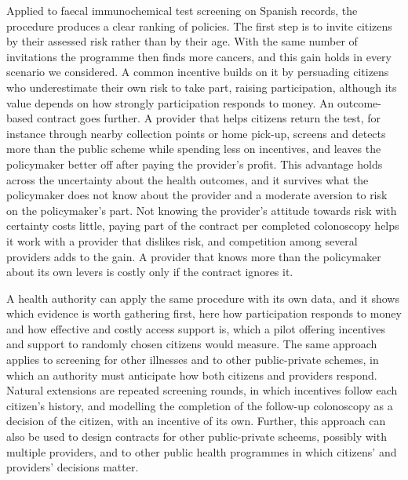 \documentclass[12pt]{article}
\begin{document}
Applied to faecal immunochemical test screening on Spanish records, the procedure produces a clear ranking of policies. The first step is to invite citizens by their assessed risk rather than by their age. With the same number of invitations the programme then finds more cancers, and this gain holds in every scenario we considered. A common incentive builds on it by persuading citizens who underestimate their own risk to take part, raising participation, although its value depends on how strongly participation responds to money. An outcome-based contract goes further. A provider that helps citizens return the test, for instance through nearby collection points or home pick-up, screens and detects more than the public scheme while spending less on incentives, and leaves the policymaker better off after paying the provider's profit. This advantage holds across the uncertainty about the health outcomes, and it survives what the policymaker does not know about the provider and a moderate aversion to risk on the policymaker's part. Not knowing the provider's attitude towards risk with certainty costs little, paying part of the contract per completed colonoscopy helps it work with a provider that dislikes risk, and competition among several providers adds to the gain. A provider that knows more than the policymaker about its own levers is costly only if the contract ignores it.

A health authority can apply the same procedure with its own data, and it shows which evidence is worth gathering first, here how participation responds to money and how effective and costly access support is, which a pilot offering incentives and support to randomly chosen citizens would measure. The same approach applies to screening for other illnesses and to other public-private schemes, in which an authority must anticipate how both citizens and providers respond. Natural extensions are repeated screening rounds, in which incentives follow each citizen's history, and modelling the completion of the follow-up colonoscopy as a decision of the citizen, with an incentive of its own. Further, this approach can also be used to design contracts for other public-private scheems, possibly with multiple providers, and to other public health programmes in which citizens' and providers' decisions matter.
\end{document}
